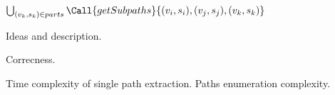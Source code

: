 \begin{algorithm}[h]
\begin{algorithmic}[1]
    \State \Return $\bigcup_{(v_k,s_k) \in parts} \Call{getSubpaths}{(v_i,s_i), (v_j,s_j),(v_k,s_k)}$
\EndFunction
\end{algorithmic}
\end{algorithm}

Ideas and description. 

Correcness.

Time complexity of single path extraction.
Paths enumeration complexity.

